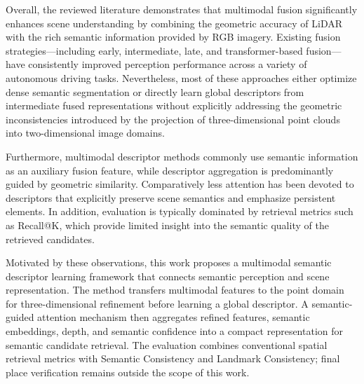 Overall, the reviewed literature demonstrates that multimodal fusion significantly enhances scene understanding by combining the geometric accuracy of LiDAR with the rich semantic information provided by RGB imagery. Existing fusion strategies—including early, intermediate, late, and transformer-based fusion—have consistently improved perception performance across a variety of autonomous driving tasks. Nevertheless, most of these approaches either optimize dense semantic segmentation or directly learn global descriptors from intermediate fused representations without explicitly addressing the geometric inconsistencies introduced by the projection of three-dimensional point clouds into two-dimensional image domains.

Furthermore, multimodal descriptor methods commonly use semantic information as an auxiliary fusion feature, while descriptor aggregation is predominantly guided by geometric similarity. Comparatively less attention has been devoted to descriptors that explicitly preserve scene semantics and emphasize persistent elements. In addition, evaluation is typically dominated by retrieval metrics such as Recall@K, which provide limited insight into the semantic quality of the retrieved candidates.

Motivated by these observations, this work proposes a multimodal semantic descriptor learning framework that connects semantic perception and scene representation. The method transfers multimodal features to the point domain for three-dimensional refinement before learning a global descriptor. A semantic-guided attention mechanism then aggregates refined features, semantic embeddings, depth, and semantic confidence into a compact representation for semantic candidate retrieval. The evaluation combines conventional spatial retrieval metrics with Semantic Consistency and Landmark Consistency; final place verification remains outside the scope of this work.
